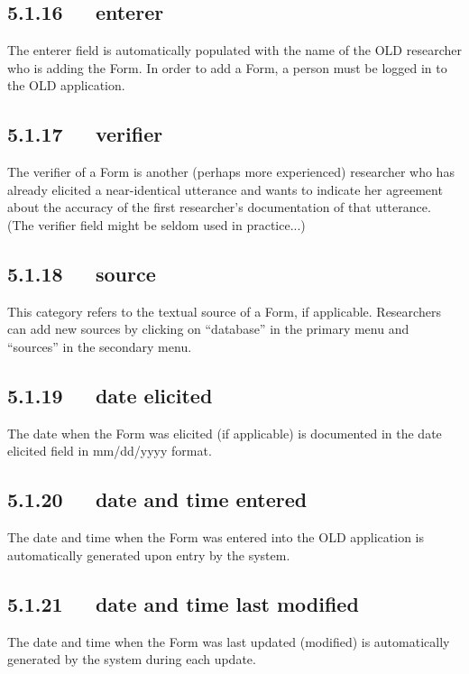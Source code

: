 \documentclass[letterpaper,10pt,english]{sphinxmanual}
\begin{document}
\subsection{5.1.16   enterer}
\label{documentation:enterer}
The enterer field is automatically populated with the name of the OLD researcher
who is adding the Form.  In order to add a Form, a person must be logged in to
the OLD application.


\subsection{5.1.17   verifier}
\label{documentation:verifier}
The verifier of a Form is another (perhaps more experienced) researcher who has
already elicited a near-identical utterance and wants to indicate her agreement
about the accuracy of the first researcher's documentation of that utterance.
(The verifier field might be seldom used in practice...)


\subsection{5.1.18   source}
\label{documentation:source}
This category refers to the textual source of a Form, if applicable.
Researchers can add new sources by clicking on ``database'' in the primary menu
and ``sources'' in the secondary menu.


\subsection{5.1.19   date elicited}
\label{documentation:date-elicited}
The date when the Form was elicited (if applicable) is documented in the date
elicited field in mm/dd/yyyy format.


\subsection{5.1.20   date and time entered}
\label{documentation:date-and-time-entered}
The date and time when the Form was entered into the OLD application is
automatically generated upon entry by the system.


\subsection{5.1.21   date and time last modified}
\label{documentation:date-and-time-last-modified}
The date and time when the Form was last updated (modified) is automatically
generated by the system during each update.
\end{document}
